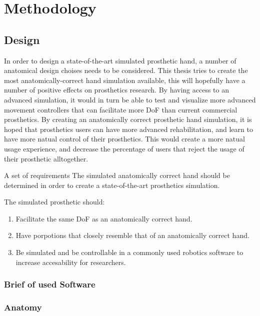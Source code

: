 \documentclass[../main.tex]{subfiles}
\begin{document}
\section{Methodology}

\subsection{Design}

In order to design a state-of-the-art simulated prosthetic hand, a number of anatomical design choises needs to be considered.
This thesis tries to create the most anatomically-correct hand simulation available, this will hopefully have a number of positive effects on prosthetics research.
By having access to an advanced simulation, it would in turn be able to test and visualize more advanced movement controllers that can facilitate more DoF than current commercial prosthetics. 
By creating an anatomically correct prosthetic hand simulation, it is hoped that prosthetics users can have more advanced rehabilitation, and learn to have more natual control of their prosthetics. This would create a more natual usage experience, and decrease the percentage of users that reject the usage of their prosthetic alltogether.

A set of requirements The simulated anatomically correct hand should be determined in order to create a state-of-the-art prosthetics simulation.

The simulated prosthetic should:

\begin{enumerate}
\item Facilitate the same DoF as an anatomically correct hand.
\item Have porpotions that closely resemble that of an anatomically correct hand.
\item Be simulated and be controllable in a commonly used robotics software to increase accesability for researchers.
\end{enumerate}


\subsubsection{Brief of used Software}
\label{sec:software}

\subsubsection{Anatomy}
\label{sec:anatomy}
\end{document}
